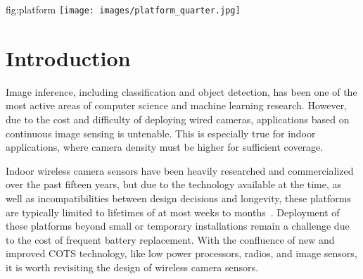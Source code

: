 \begin{definefigure}{fig:platform}
\texttt{[image: images/platform\_quarter.jpg]}
\vspace{-2\baselineskip}
\caption{ \name{}. 
}
\end{definefigure}

\section{Introduction}
Image inference, including classification and object detection, has been one of the most active areas of computer science and machine learning research. However, due to the cost and difficulty of deploying wired cameras, applications based on continuous image sensing is untenable. This is especially true for indoor applications, where camera density must be higher for sufficient coverage.

Indoor wireless camera sensors have been heavily researched and commercialized over the past fifteen years, but due to the technology available at the time, as well as incompatibilities between design decisions and longevity, these platforms are typically limited to lifetimes of at most weeks to months~\cite{rowe2007firefly,rahimi2005cyclops,blinkindoor,wyzeoutdoor,josephson2019wireless}. 
Deployment of these platforms beyond small or temporary installations remain a challenge due to the cost of frequent battery replacement.
With the confluence of new and improved COTS technology, like low power processors, radios, and image sensors, it is worth revisiting the design of wireless camera sensors. 

